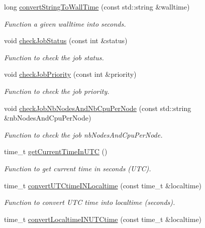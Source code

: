 \begin{DoxyCompactItemize}
long \hyperlink{namespacevishnu_aed3383125fa0df584941fc4dac560e9e}{convertStringToWallTime} (const std::string \&walltime)
\begin{DoxyCompactList}\small\item\em Function a given walltime into seconds. \item\end{DoxyCompactList}\item 
void \hyperlink{namespacevishnu_a8460fc46c76d0b8e7efedbc571487d1f}{checkJobStatus} (const int \&status)
\begin{DoxyCompactList}\small\item\em Function to check the job status. \item\end{DoxyCompactList}\item 
void \hyperlink{namespacevishnu_aa59f3181383172b450f3621192c3ad26}{checkJobPriority} (const int \&priority)
\begin{DoxyCompactList}\small\item\em Function to check the job priority. \item\end{DoxyCompactList}\item 
void \hyperlink{namespacevishnu_a66c4f962fb018f2e5e89d81f06357ca3}{checkJobNbNodesAndNbCpuPerNode} (const std::string \&nbNodesAndCpuPerNode)
\begin{DoxyCompactList}\small\item\em Function to check the job nbNodesAndCpuPerNode. \item\end{DoxyCompactList}\item 
time\_\-t \hyperlink{namespacevishnu_a34810356a494e9db0e924c76889474b0}{getCurrentTimeInUTC} ()
\begin{DoxyCompactList}\small\item\em Function to get current time in seconds (UTC). \item\end{DoxyCompactList}\item 
time\_\-t \hyperlink{namespacevishnu_a912b9d87fc92812a07bb7f6dce8dcb85}{convertUTCtimeINLocaltime} (const time\_\-t \&localtime)
\begin{DoxyCompactList}\small\item\em Function to convert UTC time into localtime (seconds). \item\end{DoxyCompactList}\item 
time\_\-t \hyperlink{namespacevishnu_a7607f0891ab382dcb2343a36d9b25190}{convertLocaltimeINUTCtime} (const time\_\-t \&localtime)

\end{DoxyCompactItemize}
